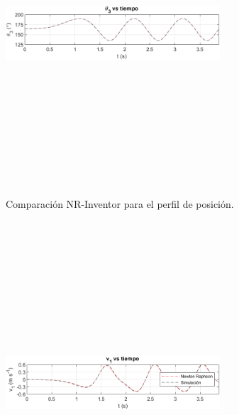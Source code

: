 \documentclass[12pt]{article}
\begin{document}
\begin{multicols}{2}
\begin{figure} [H]
    \end{figure}
        \vspace{-25pt}
        \begin{figure} [H]
        \centerline{\includegraphics[width=8cm, height=12cm,keepaspectratio]{Inventor vs NR/theta3 vs inventor.png}}
        \caption{Comparación NR-Inventor para el perfil de posición.}
        \label{}
    \end{figure}
\begin{figure} [H]
        \centerline{\includegraphics[width=8cm, height=12cm,keepaspectratio]{Inventor vs NR/v1 vs inventor.png}}

\end{figure}
\end{multicols}
\end{document}
